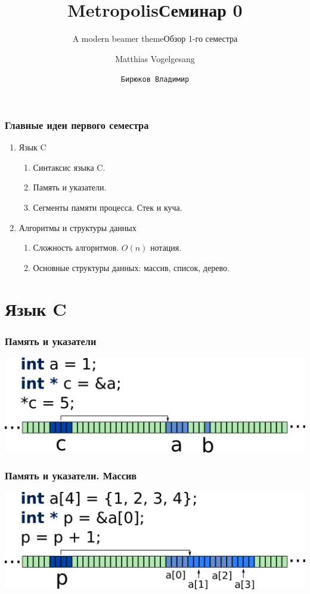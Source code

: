 \documentclass[10pt]{beamer}
\title{Metropolis}
\subtitle{A modern beamer theme}
\date{}
\author{Matthias Vogelgesang}
\institute{Center for modern beamer themes}
\title{Семинар 0}
\subtitle{Обзор 1-го семестра}
\author{\texttt{Бирюков Владимир}}
\institute{МФТИ}
\begin{document}
%
%

\maketitle

\begin{frame}[fragile]
\frametitle{Главные идеи первого семестра}
\begin{enumerate}
\item Язык C
\begin{enumerate}
\item Синтаксис языка C.
\item Память и указатели.
\item Сегменты памяти процесса. Стек и куча.
\end{enumerate}
\item Алгоритмы и структуры данных
\begin{enumerate}
\item Сложность алгоритмов. $O(n)$ нотация.
\item Основные структуры данных: массив, список, дерево.
\end{enumerate}
\end{enumerate}
\end{frame}


\section{Язык C}


\begin{frame}[fragile]
\frametitle{Память и указатели} 
\begin{center}
\includegraphics[width=0.95\linewidth]{images/memory_pointer_4.png}
\end{center}
\end{frame}

\begin{frame}[fragile]
\frametitle{Память и указатели. Массив} 
\begin{center}
\includegraphics[width=0.95\linewidth]{images/memory_parrays_2.png}
\end{center}
\end{frame}
\end{document}
